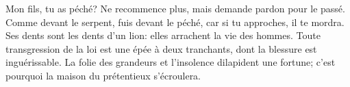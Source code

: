 Mon fils, tu as péché?
	Ne recommence plus, mais demande pardon pour le passé.
Comme devant le serpent, fuis devant le péché,
	car si tu approches, il te mordra.
	Ses dents sont les dents d’un lion: elles arrachent la vie des hommes.
Toute transgression de la loi est une épée à deux tranchants,
	dont la blessure est inguérissable.
La folie des grandeurs et l’insolence dilapident une fortune;
	c’est pourquoi la maison du prétentieux s’écroulera.

